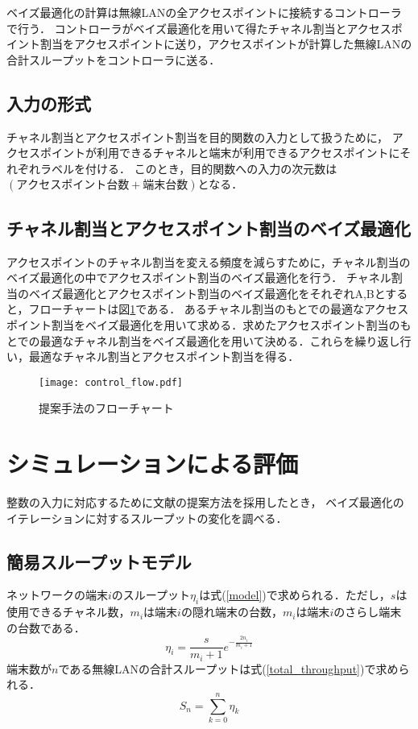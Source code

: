 \documentclass[a4paper,11pt]{jarticle}
\begin{document}
ベイズ最適化の計算は無線LANの全アクセスポイントに接続するコントローラで行う．
コントローラがベイズ最適化を用いて得たチャネル割当とアクセスポイント割当をアクセスポイントに送り，アクセスポイントが計算した無線LANの合計スループットをコントローラに送る．

\subsection{入力の形式}
チャネル割当とアクセスポイント割当を目的関数の入力として扱うために，
アクセスポイントが利用できるチャネルと端末が利用できるアクセスポイントにそれぞれラベルを付ける．
このとき，目的関数への入力の次元数は$(アクセスポイント台数+端末台数)$となる．

\subsection{チャネル割当とアクセスポイント割当のベイズ最適化}
アクセスポイントのチャネル割当を変える頻度を減らすために，チャネル割当のベイズ最適化の中でアクセスポイント割当のベイズ最適化を行う．
チャネル割当のベイズ最適化とアクセスポイント割当のベイズ最適化をそれぞれA,Bとすると，フローチャートは図\ref{control_flow}である．
あるチャネル割当のもとでの最適なアクセスポイント割当をベイズ最適化を用いて求める．求めたアクセスポイント割当のもとでの最適なチャネル割当をベイズ最適化を用いて決める．これらを繰り返し行い，最適なチャネル割当とアクセスポイント割当を得る．

\begin{figure}[t]
  \centering
  \texttt{[image: control\_flow.pdf]}
  \caption{提案手法のフローチャート}
  \label{control_flow}
\end{figure}

\section{シミュレーションによる評価}
整数の入力に対応するために文献\cite{Garrido-Merchan2018}の提案方法を採用したとき，
ベイズ最適化のイテレーションに対するスループットの変化を調べる．

\subsection{簡易スループットモデル\cite{Wu2000}}
ネットワークの端末$i$のスループット$\eta_i$は式(\ref{model})で求められる．ただし，$s$は使用できるチャネル数，$m_i$は端末$i$の隠れ端末の台数，$m_i$は端末$i$のさらし端末の台数である．
\begin{equation}
  \eta_i=\frac{s}{m_i+1}e^{-\frac{2n_i}{m_i+1}} \label{model}
\end{equation}
端末数が$n$である無線LANの合計スループットは式(\ref{total_throughput})で求められる．
\begin{equation}
  S_n=\sum_{k=0}^{n}\eta_k \label{total_throughput}
\end{equation}
\end{document}
